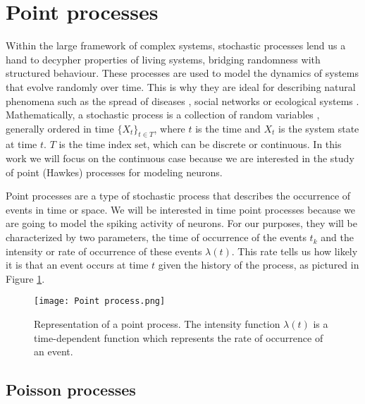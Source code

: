 \section{Point processes} \label{sec:point_processes}
Within the large framework of complex systems, stochastic processes lend us a hand to decypher properties of living systems, bridging randomness with structured behaviour.
These processes are used to model the dynamics of systems that evolve randomly over time. This is why they are ideal for describing natural phenomena such as 
the spread of diseases \cite{Chowell}, social networks \cite{castellano2009statistical} or ecological systems \cite{azaele2016statistical}. Mathematically, a stochastic process
is a collection of random variables \cite{McKane}, generally ordered in time $ \{X_t\}_{t \in T} $, where $t$ is the time and $X_t$ is the system state at time $t$. $T$ is the time index set, 
which can be discrete or continuous. In this work we will focus on the continuous case because we are interested in the study of point (Hawkes) processes for modeling neurons. 

Point processes are a type of stochastic process that describes the occurrence of events in time or space. We will be interested in time point processes because 
we are going to model the spiking activity of neurons. For our purposes, they will be characterized by two parameters, the time of occurrence
of the events $t_k$ and the intensity or rate of occurrence of these events $\lambda(t)$. This rate tells us how likely it is that an event occurs at time $t$ given the history of the process, 
as pictured in Figure \ref{f:point_process}.

\begin{figure}[H]
    \centering
    \texttt{[image: Point process.png]}
    \caption{Representation of a point process. The intensity function $\lambda(t)$ is a time-dependent function which represents the rate of occurrence of an event.}
    \label{f:point_process}
\end{figure}

\subsection{Poisson processes} \label{subsec:Poisson_processes}

